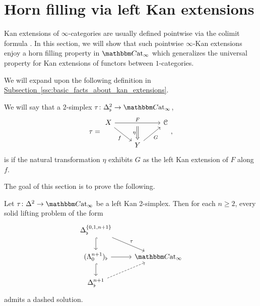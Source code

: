 \documentclass[main.tex]{subfiles}
\begin{document}
\section{Horn filling via left Kan extensions}
\label{sec:horn_filling_via_left_kan_extensions}

Kan extensions of $\infty$-categories are usually defined pointwise via the colimit formula \cite{highertopostheory} \cite{cisinski2019higher}. In this section, we will show that such pointwise $\infty$-Kan extensions enjoy a horn filling property in $\ICCat$ which generalizes the universal property for Kan extensions of functors between $1$-categories.

We will expand upon the following definition in \hyperref[ssc:basic_facts_about_kan_extensions]{Subsection~\ref*{ssc:basic_facts_about_kan_extensions}}.

\begin{definition}
  \label{def:left_kan}
  We will say that a $2$-simplex $\tau\colon \Delta^{2}_{\flat} \to \ICCat$,
  \begin{equation}
    \label{eq:prototypical_left_kan_simplex}
    \tau =
    \begin{tikzcd}
      X
      \arrow[dr, swap, "f"]
      \arrow[rr, "F", ""{below, name=M}]
      && \category{C}
      \\
      & Y
      \arrow[ur, swap, "G"]
      \arrow[from=M, Rightarrow, swap, "\eta"]
    \end{tikzcd},
  \end{equation}
  is  if the natural transformation $\eta$ exhibits $G$ as the left Kan extension of $F$ along $f$.
\end{definition}

The goal of this section is to prove the following.

\begin{theorem}
  \label{thm:left_kan_implies_globally_left_kan}
  Let $\tau\colon \Delta^{2} \to \ICCat$ be a left Kan 2-simplex. Then for each $n \geq 2$, every solid lifting problem of the form
  \begin{equation}
    \label{eq:lifting_problems_for_global_kan_extensions}
    \begin{tikzcd}
      \Delta^{\{0,1,n+1\}}_{\flat}
      \arrow[d, hook]
      \arrow[dr, "\tau"]
      \\
      (\Lambda^{n+1}_{0})_{\flat}
      \arrow[r]
      \arrow[d, hook]
      & \ICCat
      \\
      \Delta^{n+1}_{\flat}
      \arrow[ur, dashed]
    \end{tikzcd}
  \end{equation}
  admits a dashed solution.
\end{theorem}
\end{document}
